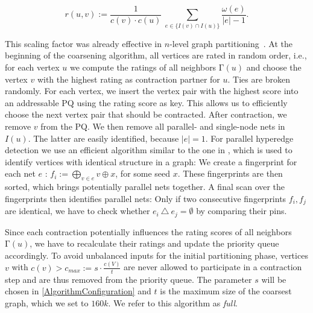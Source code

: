 \documentclass[runningheads,a4paper]{llncs}
\begin{document}
\begin{equation}
r(u,v) := \frac{1}{{c(v) \cdot c(u)}}~\sum \limits_{e \in \{I(v) \cap I(u)\}}  \frac{\omega(e)}{|e| - 1}.
\end{equation}

This scaling factor was already effective in $n$-level graph partitioning~\cite{nGP}.
At the beginning of the coarsening algorithm, all vertices are rated in random order, i.e., for each vertex $u$ we 
compute the ratings of all neighbors $\mathrm{\Gamma}(u)$ and choose the vertex $v$ with the highest rating as contraction partner for $u$.
Ties are broken randomly. For each vertex, we insert the vertex pair with the highest score into an addressable PQ 
using the rating score as key. This allows us to efficiently choose the next vertex pair that should be contracted. After contraction, we remove 
$v$ from the PQ. We then remove all parallel- and single-node nets in $I(u)$. 
The latter are easily identified, because $|e|=1$. For parallel hyperedge detection we use an efficient algorithm similar to the one in \cite{ParallelHEDetection},
which is used to identify vertices with identical structure in a graph: 
We create a fingerprint for each net $e$ : $f_i := \bigoplus_{v \in e} v\oplus x$, for some seed $x$. These fingerprints are then sorted, which brings potentially
parallel nets together. A final scan over the fingerprints then identifies parallel nets: Only if two consecutive fingerprints $f_i, f_j$ are 
identical, we have to check whether $e_i~\triangle~e_j = \emptyset$ by comparing their pins.

Since each contraction potentially influences the rating scores of all neighbors $\mathrm{\Gamma}(u)$, we have to recalculate their ratings 
and update the priority queue accordingly. To avoid unbalanced inputs for the initial partitioning phase, vertices $v$ 
with $c(v) > c_{max} := s  \cdot \frac{c(V)}{t}$ are never allowed to participate in a contraction step and are thus removed from the priority queue.
The parameter $s$ will be chosen in \autoref{AlgorithmConfiguration} and $t$ is the maximum size of the coarsest graph, which we set to $160k$. 
We refer to this algorithm as \emph{full}.
\end{document}
